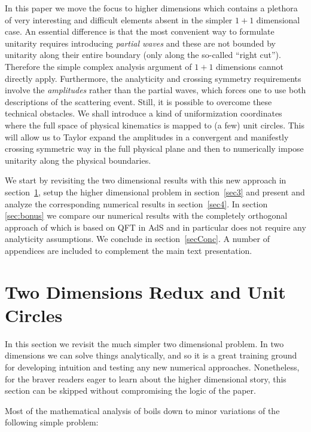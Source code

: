 \documentclass[12pt]{article}
\newcommand{\la}[1]{\label{#1}}
\newcommand{\<}{{\langle}}
\renewcommand{\>}{{\rangle}}
\begin{document}
In this paper we move the focus to higher dimensions which contains a plethora of very interesting and difficult elements absent in the simpler $1+1$ dimensional case. An essential difference is that the most convenient way to formulate unitarity requires introducing {\it partial waves} and these are not bounded by unitarity along their entire boundary (only along the so-called ``right cut''). Therefore the simple complex analysis argument of $1+1$ dimensions cannot directly apply. Furthermore, the analyticity and crossing symmetry requirements involve the \textit{amplitudes} rather than the partial waves, which forces one to use both descriptions of the scattering event. Still, it is possible to overcome these technical obstacles. We shall introduce a kind of uniformization coordinates where the full space of physical kinematics is mapped to (a few) unit circles. This will allow us to Taylor expand the amplitudes in a convergent and manifestly crossing symmetric way in the full physical plane and then to numerically impose unitarity along the physical boundaries.

We start by revisiting the two dimensional results with this new approach in section~\ref{sec2}, setup the higher dimensional problem in section~\ref{sec3} and present and analyze the corresponding numerical results in section~\ref{sec4}. In section \ref{sec:bonus} we compare our numerical results with the completely orthogonal approach of \cite{paperI} which is based on QFT in AdS and in particular does not require any analyticity assumptions. We conclude in section~\ref{secConc}. A number of appendices are included to complement the main text presentation.

\section{Two Dimensions Redux and Unit Circles}  \la{sec2}

In this section we revisit the much simpler two dimensional problem. In two dimensions we can solve things analytically, and so it is a great training ground for developing intuition and testing any new numerical approaches. Nonetheless, for the braver readers eager to learn about the higher dimensional story, this section can be skipped without compromising the logic of the paper. 

Most of the mathematical analysis of \cite{paperII} boils down to minor variations of the following simple problem: 
\end{document}
